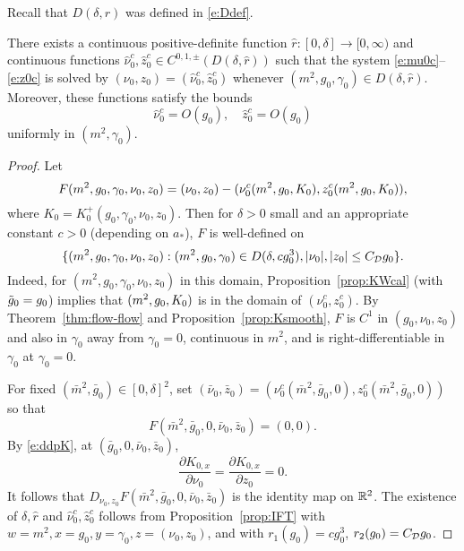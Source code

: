 Recall that $D(\delta, r)$ was defined in \eqref{e:Ddef}.

\begin{prop}
\label{prop:nuzhat}
There exists a continuous positive-definite function $\hat r : [0, \delta] \to [0, \infty)$
and continuous functions
$\hat\nu_0^c, \hat z_0^c \in C^{0,1,\pm}(D(\delta, \hat r))$ such that
the system \eqref{e:mu0c}--\eqref{e:z0c} is solved by $(\nu_0, z_0) = (\hat\nu_0^c, \hat z_0^c)$
whenever $(m^2, g_0, \gamma_0) \in D(\delta, \hat r)$.
Moreover, these functions satisfy the bounds
\begin{equation}
\label{e:hat-est-re}
\hat\nu_0^c = O(g_0),
\quad
\hat z_0^c = O(g_0)
\end{equation}
uniformly in $(m^2, \gamma_0)$.
\end{prop}

\begin{proof}
Let
\begin{equation}
F(m^2, g_0, \gamma_0, \nu_0, z_0)
= (\nu_0, z_0)
  -
  (\nu_0^c(m^2, g_0, K_0),
  z_0^c(m^2, g_0, K_0)
),
\end{equation}
where $K_0 = K^+_0(g_0, \gamma_0, \nu_0, z_0)$.
Then for $\delta > 0$ small and an appropriate constant $c > 0$ (depending on $a_*$),
$F$ is well-defined on
\begin{equation}
\{ (m^2, g_0, \gamma_0, \nu_0, z_0) : (m^2, g_0, \gamma_0) \in D(\delta, c g_0^3),
|\nu_0|, |z_0| \leq C_{\mathcal{D}} g_0 \}.
\end{equation}
Indeed, for $(m^2, g_0, \gamma_0, \nu_0, z_0)$ in this domain,
Proposition~\ref{prop:KWcal} (with $\tilde{g}_0 = g_0$) implies that $(m^2, g_0, K_0)$ is in the domain of
$(\nu_0^c, z_0^c)$.
By Theorem~\ref{thm:flow-flow} and Proposition~\ref{prop:Ksmooth},
$F$ is $C^1$ in $(g_0, \nu_0, z_0)$
and also in $\gamma_0$ away from $\gamma_0 = 0$,
continuous in $m^2$, and
is right-differentiable in $\gamma_0$ at $\gamma_0 = 0$.

For fixed $(\bar m^2, {\bar g_0}) \in [0, \delta]^2$,
set $({\bar\nu_0}, \bar z_0) = (\nu_0^c(\bar m^2, \bar g_0, 0), z_0^c(\bar m^2, \bar g_0, 0))$
so that
\begin{equation}
F(\bar m^2, \bar g_0, 0, \bar\nu_0, \bar z_0) = (0, 0).
\end{equation}
By \eqref{e:ddpK}, at $(\bar g_0, 0, \bar\nu_0, \bar z_0)$,
\begin{equation}
\frac{\partial K_{0,x}}{\partial\nu_0}
= \frac{\partial K_{0,x}}{\partial z_0} = 0.
\end{equation}
It follows that $D_{\nu_0,z_0} F(\bar m^2, \bar g_0, 0, \bar\nu_0, \bar z_0)$
is the identity map on ${\mathbb R}^2$.
The existence of $\delta, \hat r$ and $\hat\nu_0^c, \hat z_0^c$
follows from Proposition~\ref{prop:IFT} with
$w = m^2, x = g_0, y = \gamma_0, z = (\nu_0, z_0)$,
and with $r_1(g_0) = c g_0^3$, $r_2(g_0) = C_{\mathcal{D}} g_0$.


\end{proof}
